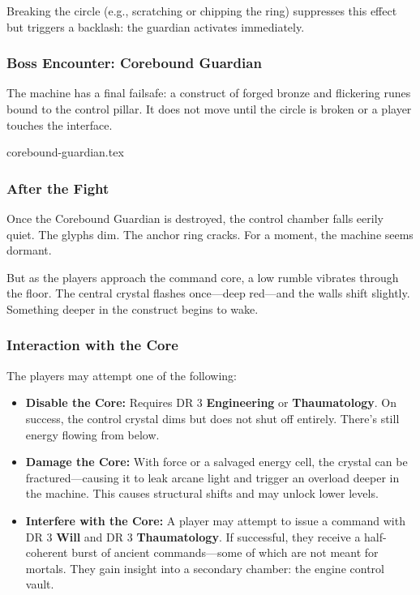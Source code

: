 Breaking the circle (e.g., scratching or chipping the ring) suppresses this effect but triggers a backlash: the guardian activates immediately.

\subsubsection*{Boss Encounter: Corebound Guardian}

The machine has a final failsafe: a construct of forged bronze and flickering runes bound to the control pillar. It does not move until the circle is broken or a player touches the interface.

{corebound-guardian.tex}

\subsubsection*{After the Fight}

Once the Corebound Guardian is destroyed, the control chamber falls eerily quiet. The glyphs dim. The anchor ring cracks. For a moment, the machine seems dormant.

But as the players approach the command core, a low rumble vibrates through the floor. The central crystal flashes once—deep red—and the walls shift slightly. Something deeper in the construct begins to wake.

\subsubsection*{Interaction with the Core}

The players may attempt one of the following:

\begin{itemize}
    \item \textbf{Disable the Core:} Requires DR 3 \textbf{Engineering} or \textbf{Thaumatology}. On success, the control crystal dims but does not shut off entirely. There’s still energy flowing from below.
    
    \item \textbf{Damage the Core:} With force or a salvaged energy cell, the crystal can be fractured—causing it to leak arcane light and trigger an overload deeper in the machine. This causes structural shifts and may unlock lower levels.

    \item \textbf{Interfere with the Core:} A player may attempt to issue a command with DR 3 \textbf{Will} and DR 3 \textbf{Thaumatology}. If successful, they receive a half-coherent burst of ancient commands—some of which are not meant for mortals. They gain insight into a secondary chamber: the engine control vault.
\end{itemize}



